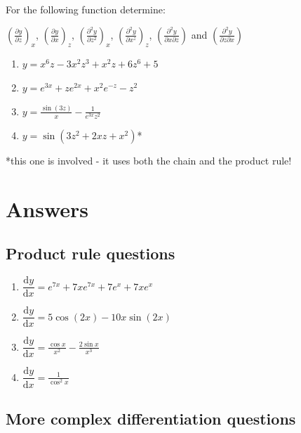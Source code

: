 \documentclass[
]{book}
\providecommand{\tightlist}{%
  \setlength{\itemsep}{0pt}\setlength{\parskip}{0pt}}
\begin{document}
For the following function determine:

\(\left(\frac{\partial y}{\partial z}\right)_x\), \(\left(\frac{\partial y}{\partial x}\right)_z\), \(\left(\frac{\partial^2 y}{\partial z^2}\right)_x\), \(\left(\frac{\partial^2 y}{\partial x^z}\right)_z\), \(\left(\frac{\partial^2 y}{\partial x \partial z}\right)\) and \(\left(\frac{\partial^2 y}{\partial z \partial x}\right)\)

\begin{enumerate}
\def\labelenumi{\arabic{enumi}.}
\tightlist
\item
  \(y = x^6z -3x^2z^3+x^2z+6z^6+5\)
\item
  \(y = e^{3x}+ze^{2x}+x^2e^{-z}-z^2\)
\item
  \(y=\frac{\sin (3z)}{x}-\frac{1}{e^{3x}z^2}\)
\item
  \(y=\sin(3z^2+2xz+x^2)\)*
\end{enumerate}

*this one is involved - it uses both the chain and the product rule!

\hypertarget{sec:Answers5}{%
\section{Answers}\label{sec:Answers5}}

\hypertarget{product-rule-questions-1}{%
\subsection{Product rule questions}\label{product-rule-questions-1}}

\begin{enumerate}
\def\labelenumi{\arabic{enumi}.}
\tightlist
\item
  \(\dfrac{\textrm{d}y}{\textrm{d}x}=e^{7x}+7xe^{7x}+ 7e^x+7xe^x\)
\item
  \(\dfrac{\textrm{d}y}{\textrm{d}x}=5 \cos (2x)-10x \sin (2x)\)
\item
  \(\dfrac{\textrm{d}y}{\textrm{d}x}= \frac{\cos x}{x^2}-\frac{2\sin x}{x^3}\)
\item
  \(\dfrac{\textrm{d}y}{\textrm{d}x}=\frac{1}{\cos^2 x}\)
\end{enumerate}

\hypertarget{more-complex-differentiation-questions-1}{%
\subsection{More complex differentiation questions}\label{more-complex-differentiation-questions-1}}
\end{document}

